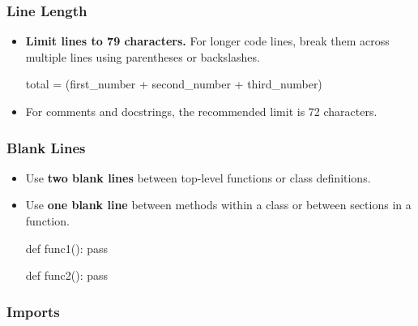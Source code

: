 \documentclass[
  letterpaper,
  DIV=11,
  numbers=noendperiod]{scrreprt}
\newenvironment{Shaded}{\begin{snugshade}}{\end{snugshade}}
\newcommand{\ControlFlowTok}[1]{\textcolor[rgb]{0.00,0.23,0.31}{#1}}
\newcommand{\KeywordTok}[1]{\textcolor[rgb]{0.00,0.23,0.31}{#1}}
\newcommand{\NormalTok}[1]{\textcolor[rgb]{0.00,0.23,0.31}{#1}}
\newcommand{\OperatorTok}[1]{\textcolor[rgb]{0.37,0.37,0.37}{#1}}
\begin{document}
\hypertarget{line-length}{%
\subsubsection{Line Length}\label{line-length}}

\begin{itemize}
\item
  \textbf{Limit lines to 79 characters.} For longer code lines, break
  them across multiple lines using parentheses or backslashes.

\begin{Shaded}
\begin{Highlighting}[]
\NormalTok{total }\OperatorTok{=}\NormalTok{ (first\_number }
         \OperatorTok{+}\NormalTok{ second\_number }
         \OperatorTok{+}\NormalTok{ third\_number)}
\end{Highlighting}
\end{Shaded}
\item
  For comments and docstrings, the recommended limit is 72 characters.
\end{itemize}

\hypertarget{blank-lines}{%
\subsubsection{Blank Lines}\label{blank-lines}}

\begin{itemize}
\item
  Use \textbf{two blank lines} between top-level functions or class
  definitions.
\item
  Use \textbf{one blank line} between methods within a class or between
  sections in a function.

\begin{Shaded}
\begin{Highlighting}[]
\KeywordTok{def}\NormalTok{ func1():}
    \ControlFlowTok{pass}

\KeywordTok{def}\NormalTok{ func2():}
    \ControlFlowTok{pass}
\end{Highlighting}
\end{Shaded}
\end{itemize}

\hypertarget{imports}{%
\subsubsection{Imports}\label{imports}}
\end{document}
